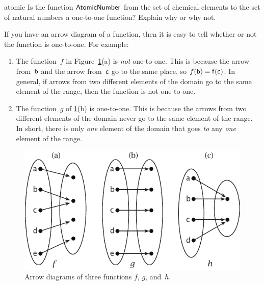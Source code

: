 \begin{exercise}{atomic}
Is the function $\sf{Atomic Number}$ from the set of chemical elements to the set of natural numbers a one-to-one function?  Explain why or why not.
\end{exercise}

\begin{rem}
If you have an arrow diagram of a function, then it is easy to tell whether or not the function is one-to-one. For example:

\begin{enumerate}
\item The function~$f$ in Figure~\ref{arrow11}(a) is \emph{not} one-to-one. This is because the arrow from~$\sf{b}$ and the arrow from~$\sf{c}$ go to the same place, so $f(\sf{b}) = f(\sf{c})$. In general, if arrows from two different elements of the domain go to the same element of the range, then the function is not one-to-one. 
\item The function~$g$ of \ref{arrow11}(b) is one-to-one. This is because the arrows from two different elements of the domain never go to the same element of the range.  In short, there is only \emph{one} element of the domain that goes \emph{to} any \emph{one} element of the range.  
\end{enumerate}
\end{rem}
\begin{figure}[h]
\includegraphics{images/arrow11.pdf}
\caption{Arrow diagrams of three functions $f$, $g$, and~$h$.}
\label{arrow11}
\end{figure}

